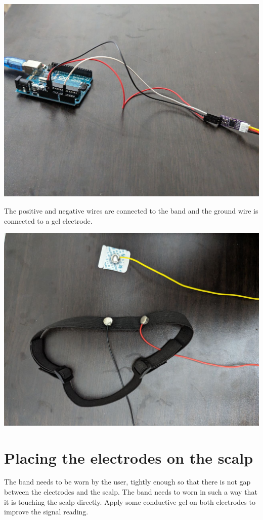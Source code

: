 \documentclass[
  letterpaper,
  DIV=11,
  numbers=noendperiod]{scrreprt}
\begin{document}
\includegraphics{images/clipboard-853366779.png}

The positive and negative wires are connected to the band and the ground
wire is connected to a gel electrode.

\includegraphics{images/clipboard-4134519690.png}

\section{Placing the electrodes on the
scalp}\label{placing-the-electrodes-on-the-scalp}

The band needs to be worn by the user, tightly enough so that there is
not gap between the electrodes and the scalp. The band needs to worn in
such a way that it is touching the scalp directly. Apply some conductive
gel on both electrodes to improve the signal reading.
\end{document}
